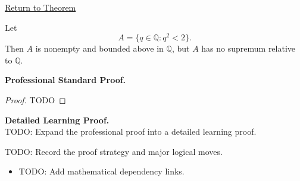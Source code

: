 \newpage
{}
\label{prf:rational-gap-suprema}

\begin{remark*}[Return]
\hyperref[lem:rational-gap-suprema]{Return to Theorem}
\end{remark*}

\begin{theorem*}
Let
\[
  A=\{q\in\mathbb{Q}:q^2<2\}.
\]
Then $A$ is nonempty and bounded above in $\mathbb{Q}$, but $A$ has no supremum relative to $\mathbb{Q}$.
\end{theorem*}

\textbf{Professional Standard Proof.}~\\
\begin{proof}
TODO
\end{proof}

\textbf{Detailed Learning Proof.}~\\
TODO: Expand the professional proof into a detailed learning proof.

\begin{remark*}
TODO: Record the proof strategy and major logical moves.
\end{remark*}

\begin{dependencies}
\begin{itemize}
  \item TODO: Add mathematical dependency links.
\end{itemize}
\end{dependencies}
